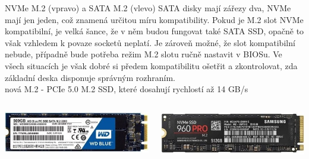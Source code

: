 \documentclass[aspectratio=43]{beamer}
\begin{document}
\begin{frame}{NVMe M.2 (vpravo) a SATA M.2 (vlevo)}
	SATA disky mají zářezy dva, NVMe mají jen jeden, což znamená určitou míru kompatibility. Pokud je M.2 slot NVMe kompatibilní, je velká šance, že v něm budou fungovat také SATA SSD, opačně to však vzhledem k povaze socketů neplatí. Je zároveň možné, že slot kompatibilní nebude, případně bude potřeba režim M.2 slotu ručně nastavit 
	v BIOSu. Ve všech situacích je však dobré si předem 
	kompatibilitu ošetřit a zkontrolovat, zda základní deska 
	disponuje správným rozhraním.\\
    nová M.2 - PCIe 5.0 M.2 SSD, které dosahují rychlostí až 14 GB/s
	
	\begin{columns}
		\begin{center}
			\includegraphics[width=1\linewidth]{extrahovane_obrazky/img_2_page36_0.jpeg}
		\end{center}
		\begin{center}
			\includegraphics[width=1\linewidth]{extrahovane_obrazky/img_2_page36_1.jpeg}
		\end{center}
	\end{columns}
\end{frame}
\end{document}
